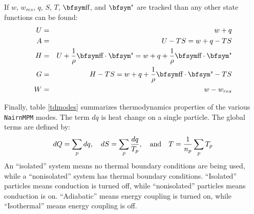 \documentclass[11pt]{book}
\def\st{{\hbox{\bfsym\char'033}}}
\def\et{{\hbox{\bfsym\char'042}}}
\begin{document}
If $w$, $w_{res}$, $q$, $S$, $T$, $\st$, and $\et$ are tracked than any other state functions can be found:
\begin{eqnarray}
           U & = & w+q \\
           A & = & U - TS = w+q-TS \\
           H & = & U + {1\over\rho} \st\cdot\et = w+q+ {1\over\rho} \st\cdot\et \\
           G & = & H-TS = w+q+ {1\over\rho} \st\cdot\et - TS \\
           W & = & w - w_{res}
\end{eqnarray}

Finally, table \ref{tdmodes} summarizes thermodynamics properties of the various {\tt NairnMPM} modes. The term $dq$ is heat change on a single particle. The global terms are defined by:
\begin{equation}
     dQ = \sum_p dq, \quad dS = \sum_p {dq\over T_p}, \quad{\rm and}\quad T = {1\over n_p}\sum_p T_p
\end{equation}
An ``isolated'' system means no thermal boundary conditions are being used, while a ``nonisolated'' system has thermal boundary conditions. ``Isolated'' particles means conduction is turned off, while ``nonisolated'' particles means conduction is on. ``Adiabatic'' means energy coupling is turned on, while ``Isothermal'' means energy coupling is off.
\end{document}
